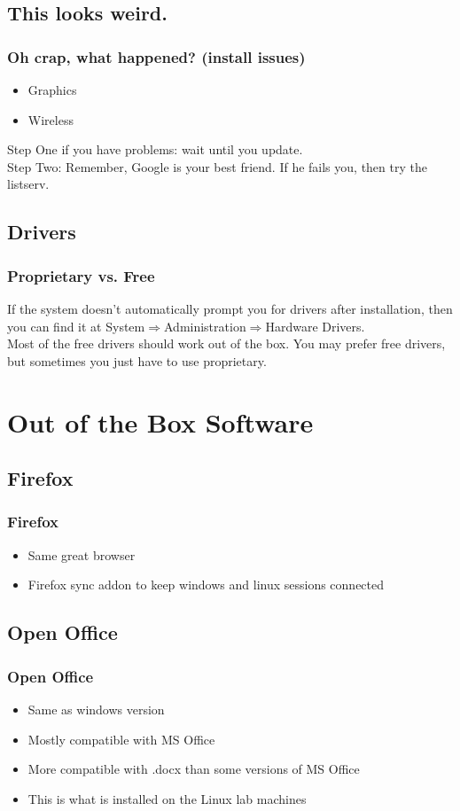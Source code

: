 \documentclass[hyperref={pdfpagelabels=false}]{beamer}
\begin{document}
\subsection{This looks weird.}
\frame
{
	\frametitle{Oh crap, what happened? (install issues)}
	\begin{itemize}
	\item{Graphics}
	\item{Wireless}
	\end{itemize}
	Step One if you have problems: wait until you update.\\
	Step Two: Remember, Google is your best friend. If he fails you, then try the listserv.
}
\subsection{Drivers}
\frame
{
	\frametitle{Proprietary vs. Free}
	If the system doesn't automatically prompt you for drivers after installation, then you can find it at System$\Rightarrow$Administration$\Rightarrow$Hardware Drivers. \\
	Most of the free drivers should work out of the box. You may prefer free drivers, but sometimes you just have to use proprietary.
}
\section{Out of the Box Software}
\subsection{Firefox}
\frame
{
    \frametitle{Firefox}
    \begin{itemize}
    \item{Same great browser}
    \item{Firefox sync addon to keep windows and linux sessions connected}
    \end{itemize}
}
\subsection{Open Office}
\frame
{
    \frametitle{Open Office}
    \begin{itemize}
    \item{Same as windows version}
    \item{Mostly compatible with MS Office}
    \item{More compatible with .docx than some versions of MS Office}
	\item{This is what is installed on the Linux lab machines}
    \end{itemize}
}
\end{document}
